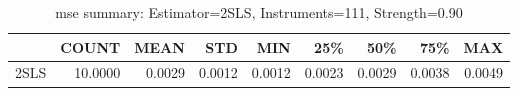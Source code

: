 \begin{table}[ht]
\centering
\caption{mse summary: Estimator=2SLS, Instruments=111, Strength=0.90}
\begin{tabular}{lrrrrrrrr}
\toprule
 & COUNT & MEAN & STD & MIN & 25\% & 50\% & 75\% & MAX \\
\midrule
2SLS & 10.0000 & 0.0029 & 0.0012 & 0.0012 & 0.0023 & 0.0029 & 0.0038 & 0.0049 \\
\bottomrule
\end{tabular}
\end{table}

